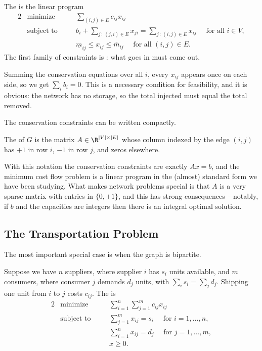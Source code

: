 \documentclass[a4paper]{scrartcl}
\begin{document}
\begin{definition}
    The  is the linear program
    \begin{alignat*}{2}
        & \text{minimize} \quad && \sum_{(i,j) \in E}c_{ij}x_{ij} \\
        & \text{subject to} \quad && b_i + \sum_{j\,:\,(j,i)\in E}x_{ji} = \sum_{j\,:\,(i,j)\in E}x_{ij} \quad \text{ for all } i \in V,\\
        & && \underline m_{ij} \leq x_{ij} \leq \overline m_{ij} \quad \text{ for all } (i,j) \in E.
    \end{alignat*}
    The first family of constraints is : what goes in must come out.
\end{definition}

Summing the conservation equations over all $i$, every $x_{ij}$ appears once on each side, so we get $\sum_i b_i = 0$. This is a necessary condition for feasibility, and it is obvious: the network has no storage, so the total injected must equal the total removed.

The conservation constraints can be written compactly.

\begin{definition}
    The  of $G$ is the matrix $A \in \R^{|V|\times|E|}$ whose column indexed by the edge $(i,j)$ has $+1$ in row $i$, $-1$ in row $j$, and zeros elsewhere.
\end{definition}

With this notation the conservation constraints are exactly $Ax = b$, and the minimum cost flow problem is a linear program in the (almost) standard form we have been studying. What makes network problems special is that $A$ is a very sparse matrix with entries in $\{0, \pm 1\}$, and this has strong consequences -- notably, if $b$ and the capacities are integers then there is an integral optimal solution.

\subsection{The Transportation Problem}

The most important special case is when the graph is bipartite.

\begin{definition}
    Suppose we have $n$ suppliers, where supplier $i$ has $s_i$ units available, and $m$ consumers, where consumer $j$ demands $d_j$ units, with $\sum_i s_i = \sum_j d_j$. Shipping one unit from $i$ to $j$ costs $c_{ij}$. The  is
    \begin{alignat*}{2}
        & \text{minimize} \quad && \sum_{i=1}^n\sum_{j=1}^m c_{ij}x_{ij} \\
        & \text{subject to} \quad && \sum_{j=1}^m x_{ij} = s_i \quad\text{ for } i = 1, \dots, n,\\
        & && \sum_{i=1}^n x_{ij} = d_j \quad\text{ for } j = 1, \dots, m,\\
        & && x \geq 0.
    \end{alignat*}
\end{definition}
\end{document}
